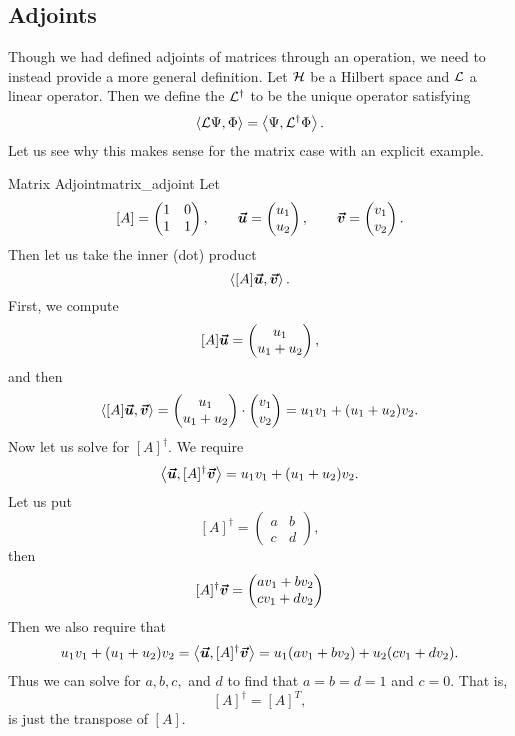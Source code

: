\subsection{Adjoints}

Though we had defined adjoints of matrices through an operation, we need to instead provide a more general definition.  Let $\mathcal{H}$ be a Hilbert space and $\mathcal{L}$ a linear operator.  Then we define the  $\mathcal{L}^\dagger$ to be the unique operator satisfying
\[
\left\langle \mathcal{L}\Psi, \Phi \right\rangle = \left\langle \Psi, \mathcal{L}^\dagger \Phi \right\rangle.
\]
Let us see why this makes sense for the matrix case with an explicit example.

\begin{ex}{Matrix Adjoint}{matrix_adjoint}
	Let 
	\[
		[A] = \begin{pmatrix} 1 & 0\\ 1 & 1 \end{pmatrix}, \qquad \boldsymbol{\boldsymbol{\vec{u}}} = \begin{pmatrix} u_1 \\ u_2  \end{pmatrix}, \qquad \boldsymbol{\boldsymbol{\vec{v}}} = \begin{pmatrix} v_1 \\ v_2 \end{pmatrix}.
	\]
	Then let us take the inner (dot) product
	\[
	\left\langle [A]\boldsymbol{\boldsymbol{\vec{u}}}, \boldsymbol{\boldsymbol{\vec{v}}} \right\rangle.
	\]
	First, we compute
	\[
	[A]\boldsymbol{\boldsymbol{\vec{u}}} = \begin{pmatrix} u_1 \\ u_1+u_2 \end{pmatrix},
	\]
	and then
	\begin{align*}
		\left\langle [A]\boldsymbol{\boldsymbol{\vec{u}}}, \boldsymbol{\boldsymbol{\vec{v}}} \right\rangle = \begin{pmatrix} u_1 \\ u_1+u_2 \end{pmatrix} \cdot \begin{pmatrix}  v_1 \\ v_2 \end{pmatrix} = u_1v_1 + (u_1+u_2)v_2.
	\end{align*}
	Now let us solve for $[A]^\dagger$.  We require
	\[
	\left\langle \boldsymbol{\boldsymbol{\vec{u}}}, [A]^\dagger \boldsymbol{\boldsymbol{\vec{v}}} \right\rangle = u_1v_1 + (u_1+u_2)v_2.
	\]
	Let us put
	\[
	[A]^\dagger = \begin{pmatrix} a & b \\ c & d \end{pmatrix},
	\]
	then 
	\[
	[A]^\dagger \boldsymbol{\boldsymbol{\vec{v}}} = \begin{pmatrix} av_1+bv_2 \\ cv_1 + dv_2 \end{pmatrix}
	\]
	Then we also require that
	\[
	u_1v_1+(u_1+u_2)v_2 = \left\langle \boldsymbol{\boldsymbol{\vec{u}}}, [A]^\dagger \boldsymbol{\boldsymbol{\vec{v}}} \right\rangle = u_1(av_1+bv_2)+u_2(cv_1+dv_2).
	\]
	Thus we can solve for $a,b,c,$ and $d$ to find that $a=b=d=1$ and $c=0$.  That is,
	\[
	[A]^\dagger = [A]^T,
	\]
	is just the transpose of $[A]$.
\end{ex}

